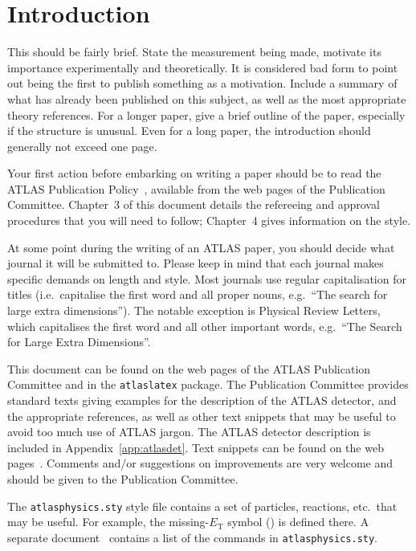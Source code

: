 \documentclass[PAPER,UKenglish,texlive=2014]{latex/atlasdoc}
\begin{document}
\section{Introduction}
\label{sec:intro}

This should be fairly brief. 
State the measurement being made, motivate its importance experimentally and theoretically.
It is considered bad form to point out being the first to publish something as a motivation.
Include a summary of what has already been published on this subject,
as well as the most appropriate theory references.
For a longer paper, give a brief outline of the paper, especially if the structure is unusual.
Even for a long paper, the introduction should generally not exceed one page.

Your first action before embarking on writing a paper should be to
read the ATLAS Publication Policy~\cite{publication-policy}, available
from the web pages of the Publication Committee. Chapter~3 of this
document details the refereeing and approval procedures that you will
need to follow; Chapter~4 gives information on the style.

At some point during the writing of an ATLAS paper, you should decide what journal it will be submitted to.
Please keep in mind that each journal makes specific demands on length and style.
Most journals use regular capitalisation for titles 
(i.e.\ capitalise the first word and all proper nouns, 
e.g.\ \enquote{The search for large extra dimensions}). 
The notable exception is Physical Review Letters, which capitalises the
first word and all other important words,
e.g.\ \enquote{The Search for Large Extra Dimensions}.

This document can be found on the web pages of the ATLAS Publication Committee
and in the \texttt{atlaslatex} package. 
The Publication Committee provides standard texts giving examples
for the description of the ATLAS detector, and the appropriate references,
as well as other text snippets that may be useful to avoid too much use of ATLAS jargon.
The ATLAS detector description is included in Appendix~\ref{app:atlasdet}.
Text snippets can be found on the web pages~\cite{pubcom-snippet}.
Comments and/or suggestions on improvements are very welcome and
should be given to the Publication Committee.

The \texttt{atlasphysics.sty} style file contains a set of particles,
reactions, etc.\ that may be useful. For example, the missing-$E_{\text{T}}$
symbol (\met{}) is defined there. 
A separate document~\cite{atlas-physics}
contains a list of the commands in \texttt{atlasphysics.sty}.
\end{document}

